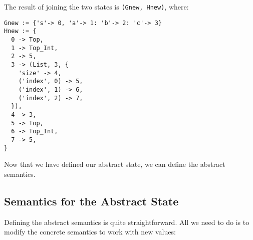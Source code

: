 The result of joining the two states is \verb+(Gnew, Hnew)+, where:

\begin{verbatim}
Gnew := {'s'-> 0, 'a'-> 1: 'b'-> 2: 'c'-> 3}
Hnew := {
  0 -> Top,
  1 -> Top_Int,
  2 -> 5,
  3 -> (List, 3, {
    'size' -> 4,
    ('index', 0) -> 5,
    ('index', 1) -> 6,
    ('index', 2) -> 7,
  }),
  4 -> 3,
  5 -> Top,
  6 -> Top_Int,
  7 -> 5,
}
\end{verbatim}

Now that we have defined our abstract state, we can define the abstract semantics.

\subsection{Semantics for the Abstract State}

Defining the abstract semantics is quite straightforward. All we need to do is to modify
the concrete semantics to work with new values:


